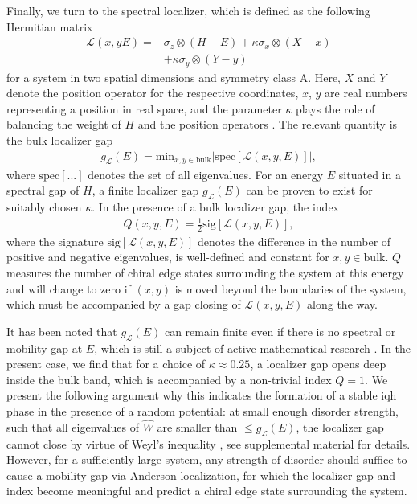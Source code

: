 \documentclass[aps,prl,amsmath,amssymb,twocolumn]{revtex4-2}
\begin{document}
Finally, we turn to the spectral localizer, which is defined as the following Hermitian matrix
\begin{align}
\mathcal L(x,y E) =&  \sigma_z \otimes (H - E) + \kappa \sigma_x \otimes (X - x) \nonumber \\
&+ \kappa \sigma_y \otimes (Y - y)
\end{align}
for a system in two spatial dimensions and symmetry class A. Here, $X$ and $Y$ denote the position operator for the respective coordinates, $x$, $y$ are real numbers representing a position in real space, and the parameter $\kappa$ plays the role of balancing the weight of $H$ and the position operators \cite{Spec_loc_1, Spec_loc_2, Spec_loc_3, Spec_loc_4}. The relevant quantity is the bulk localizer gap
\begin{align}
g_{\mathcal L}(E) = \text{min}_{x,y \in \text{bulk}} \left| \text{spec}[\mathcal L(x,y, E)]\right|, \label{Eqn:loc_gap}
\end{align}
where $\text{spec}[...]$ denotes the set of all eigenvalues. For an energy $E$ situated in a spectral gap of $H$, a finite localizer gap $g_{\mathcal L}(E)$ can be proven to exist for suitably chosen $\kappa$. In the presence of a bulk localizer gap, the index 
\begin{align}
Q(x,y, E) = \frac{1}{2} \text{sig}[\mathcal L(x,y, E)], \label{Eqn:loc_index}
\end{align}
where the signature $\text{sig}[\mathcal L(x,y, E)]$ denotes the difference in the number of positive and negative eigenvalues, is well-defined and constant for $x,y \in \text{bulk}$. $Q$ measures the number of chiral edge states surrounding the system at this energy \cite{Spec_loc_1, Spec_loc_2, Spec_loc_3, Spec_loc_4} and will change to zero if $(x,y)$ is moved beyond the boundaries of the system, which must be accompanied by a gap closing of $\mathcal L(x,y, E)$ along the way.

It has been noted that $g_{\mathcal L}(E)$ can remain finite even if there is no spectral or mobility gap at $E$, which is still a subject of active mathematical research \cite{Fulga_Bergholtz, Spec_loc_4}. In the present case, we find that for a choice of $\kappa \approx 0.25$, a localizer gap opens deep inside the bulk band, which is accompanied by a non-trivial index $Q = 1$. We present the following argument why this indicates the formation of a stable \gls{iqh} phase in the presence of a random potential: at small enough disorder strength, such that all eigenvalues of $\hat W$ are smaller than $\leq g_{\mathcal L}(E)$, the localizer gap cannot close by virtue of Weyl's inequality \cite{Fulga_Bergholtz, Spec_loc_5}, see supplemental material for details. However, for a sufficiently large system, any strength of disorder should suffice to cause a mobility gap via Anderson localization, for which the localizer gap and index become meaningful \cite{spec_loc_mobility_gap} and predict a chiral edge state surrounding the system.
\end{document}
